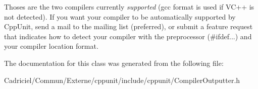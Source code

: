 Thoses are the two compilers currently {\itshape supported} (gcc format is used if V\+C++ is not detected). If you want your compiler to be automatically supported by Cpp\+Unit, send a mail to the mailing list (preferred), or submit a feature request that indicates how to detect your compiler with the preprocessor (\#ifdef...) and your compiler location format. 

The documentation for this class was generated from the following file\+:\begin{DoxyCompactItemize}
\item 
Cadriciel/\+Commun/\+Externe/cppunit/include/cppunit/Compiler\+Outputter.\+h\end{DoxyCompactItemize}

